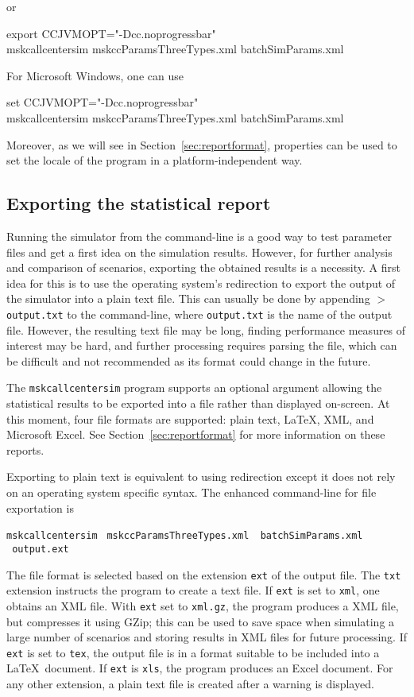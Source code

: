 or

{\noindent\ttfamily
export CCJVMOPT="-Dcc.noprogressbar"\\
mskcallcentersim mskccParamsThreeTypes.xml batchSimParams.xml
}

For Microsoft Windows, one can use

{\noindent\ttfamily
set CCJVMOPT="-Dcc.noprogressbar"\\
mskcallcentersim mskccParamsThreeTypes.xml batchSimParams.xml
}

Moreover, as we will see in Section~\ref{sec:reportformat},
properties can be used to set the locale of the program in a
platform-independent way.

\subsection{Exporting the statistical report}

Running the
simulator from the command-line is a good way to test parameter files
and get a first idea on the simulation results.
However, for further analysis and comparison of scenarios, exporting
the obtained results is a necessity.
A first idea for this is to use the
operating system's redirection to export the output of
the simulator into a plain text file.
This can usually be done by appending
\texttt{$>$ output.txt} to the command-line, where \texttt{output.txt}
is the name of the output file.
However, the resulting text file may be long, finding performance
measures of interest may be hard, and further processing requires
parsing the file, which can be difficult and not recommended
as its
format could change in the future.

The \texttt{mskcallcentersim} program supports an optional argument
allowing the statistical results to be exported into a file rather
than displayed on-screen.
At this moment, four file formats are supported: plain text, \LaTeX,
XML, and
Microsoft Excel.
See Section~\ref{sec:reportformat} for more information on these
reports.

Exporting to plain text is equivalent to using
redirection except it does not rely on an operating system specific
syntax. The enhanced command-line for file exportation is

\noindent\texttt{mskcallcentersim} \texttt{ mskccParamsThreeTypes.xml
 \ batchSimParams.xml \ output.ext}

The file format is selected based on the extension \texttt{ext} of the
output file.  The \texttt{txt} extension instructs the program to
create a text file.
If \texttt{ext} is set to \texttt{xml}, one obtains an XML file.
With \texttt{ext} set to \texttt{xml.gz}, the program produces a XML
file, but compresses it using GZip; this can be used to save space
when simulating a large number of scenarios and storing results in XML
files for future processing.
If \texttt{ext} is set to \texttt{tex}, the output file is in a format
suitable to be included into a \LaTeX\ document.
If \texttt{ext} is \texttt{xls}, the program produces an Excel
document.
For any other extension, a plain text file is created after a warning
is displayed.

